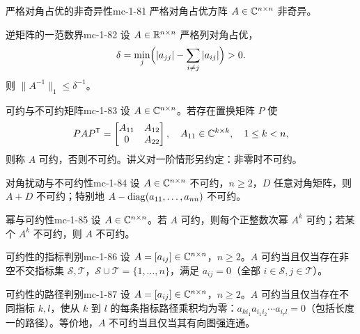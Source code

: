 \begin{theorem}{严格对角占优的非奇异性}{mc-1-81}
严格对角占优方阵 $A\in\mathbb{C}^{n\times n}$ 非奇异。
\end{theorem}

\begin{theorem}{逆矩阵的一范数界}{mc-1-82}
设 $A\in\mathbb{R}^{n\times n}$ 严格列对角占优，
\[\delta=\min_j\Bigl(|a_{jj}|-\sum_{i\ne j}|a_{ij}|\Bigr)>0.\]
则 $\|A^{-1}\|_1\leq\delta^{-1}$。
\end{theorem}

\begin{definition}{可约与不可约矩阵}{mc-1-83}
设 $A\in\mathbb{C}^{n\times n}$。若存在置换矩阵 $P$ 使
\[PAP^{\mathsf T}=\begin{bmatrix}A_{11}&A_{12}\\0&A_{22}\end{bmatrix},\quad A_{11}\in\mathbb{C}^{k\times k},\quad1\leq k<n,\]
则称 $A$ 可约，否则不可约。讲义对一阶情形另约定：非零时不可约。
\end{definition}

\begin{corollary}{对角扰动与不可约性}{mc-1-84}
设 $A\in\mathbb{C}^{n\times n}$ 不可约，$n\geq2$，$D$ 任意对角矩阵，则 $A+D$ 不可约；特别地 $A-\operatorname{diag}(a_{11},\ldots,a_{nn})$ 不可约。
\end{corollary}

\begin{theorem}{幂与可约性}{mc-1-85}
设 $A\in\mathbb{C}^{n\times n}$。若 $A$ 可约，则每个正整数次幂 $A^k$ 可约；若某个 $A^k$ 不可约，则 $A$ 不可约。
\end{theorem}

\begin{theorem}{可约性的指标判别}{mc-1-86}
设 $A=[a_{ij}]\in\mathbb{C}^{n\times n}$，$n\geq2$。$A$ 可约当且仅当存在非空不交指标集 $\mathcal S,\mathcal T$，$\mathcal S\cup\mathcal T=\{1,\ldots,n\}$，满足 $a_{ij}=0$（全部 $i\in\mathcal S,j\in\mathcal T$）。
\end{theorem}

\begin{theorem}{可约性的路径判别}{mc-1-87}
设 $A=[a_{ij}]\in\mathbb{C}^{n\times n}$，$n\geq2$。$A$ 可约当且仅当存在不同指标 $k,l$，使从 $k$ 到 $l$ 的每条指标路径乘积均为零：$a_{ki_1}a_{i_1i_2}\cdots a_{i_rl}=0$（包括长度一的路径）。等价地，$A$ 不可约当且仅当其有向图强连通。
\end{theorem}

